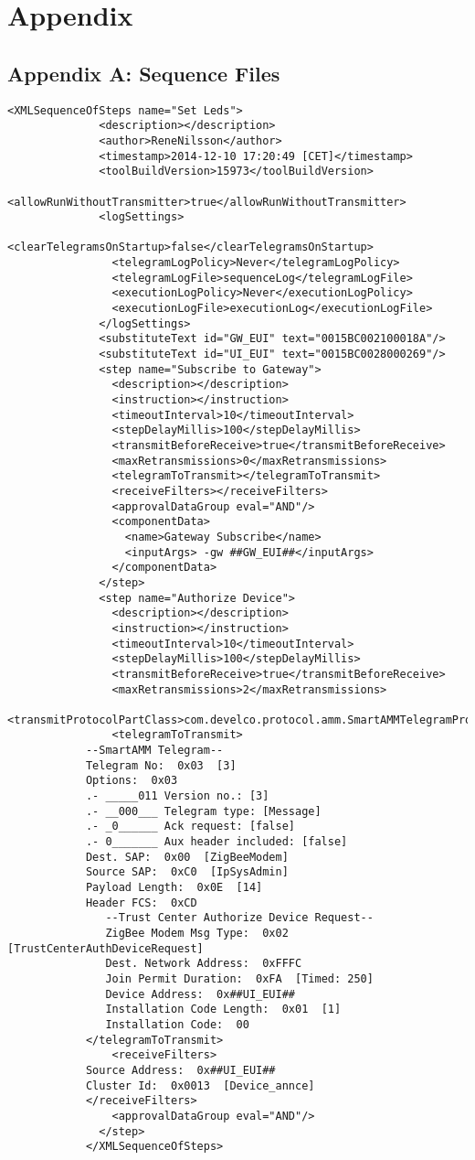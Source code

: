 \documentclass[Main]{subfiles}
\begin{document}
\section{Appendix} %
\label{sec:appendix}


	\subsection{Appendix A: Sequence Files} \label{sec:appendix_a}
		\begin{lstlisting}[caption=Authorizing End Device, style=Code-XML]
			<XMLSequenceOfSteps name="Set Leds">
			  <description></description>
			  <author>ReneNilsson</author>
			  <timestamp>2014-12-10 17:20:49 [CET]</timestamp>
			  <toolBuildVersion>15973</toolBuildVersion>
			  <allowRunWithoutTransmitter>true</allowRunWithoutTransmitter>
			  <logSettings>
			    <clearTelegramsOnStartup>false</clearTelegramsOnStartup>
			    <telegramLogPolicy>Never</telegramLogPolicy>
			    <telegramLogFile>sequenceLog</telegramLogFile>
			    <executionLogPolicy>Never</executionLogPolicy>
			    <executionLogFile>executionLog</executionLogFile>
			  </logSettings>
			  <substituteText id="GW_EUI" text="0015BC002100018A"/>
			  <substituteText id="UI_EUI" text="0015BC0028000269"/>
			  <step name="Subscribe to Gateway">
			    <description></description>
			    <instruction></instruction>
			    <timeoutInterval>10</timeoutInterval>
			    <stepDelayMillis>100</stepDelayMillis>
			    <transmitBeforeReceive>true</transmitBeforeReceive>
			    <maxRetransmissions>0</maxRetransmissions>
			    <telegramToTransmit></telegramToTransmit>
			    <receiveFilters></receiveFilters>
			    <approvalDataGroup eval="AND"/>
			    <componentData>
			      <name>Gateway Subscribe</name>
			      <inputArgs> -gw ##GW_EUI##</inputArgs>
			    </componentData>
			  </step>
			  <step name="Authorize Device">
			    <description></description>
			    <instruction></instruction>
			    <timeoutInterval>10</timeoutInterval>
			    <stepDelayMillis>100</stepDelayMillis>
			    <transmitBeforeReceive>true</transmitBeforeReceive>
			    <maxRetransmissions>2</maxRetransmissions>
			    <transmitProtocolPartClass>com.develco.protocol.amm.SmartAMMTelegramProtocol</transmitProtocolPartClass>
			    <telegramToTransmit>
			--SmartAMM Telegram--
			Telegram No:  0x03  [3]
			Options:  0x03  
			.- _____011 Version no.: [3]
			.- __000___ Telegram type: [Message]
			.- _0______ Ack request: [false]
			.- 0_______ Aux header included: [false]
			Dest. SAP:  0x00  [ZigBeeModem]
			Source SAP:  0xC0  [IpSysAdmin]
			Payload Length:  0x0E  [14]
			Header FCS:  0xCD
			   --Trust Center Authorize Device Request--
			   ZigBee Modem Msg Type:  0x02  [TrustCenterAuthDeviceRequest]
			   Dest. Network Address:  0xFFFC
			   Join Permit Duration:  0xFA  [Timed: 250]
			   Device Address:  0x##UI_EUI##
			   Installation Code Length:  0x01  [1]
			   Installation Code:  00
			</telegramToTransmit>
			    <receiveFilters>
			Source Address:  0x##UI_EUI##
			Cluster Id:  0x0013  [Device_annce]
			</receiveFilters>
			    <approvalDataGroup eval="AND"/>
			  </step>
			</XMLSequenceOfSteps>
		\end{lstlisting}
\end{document}
